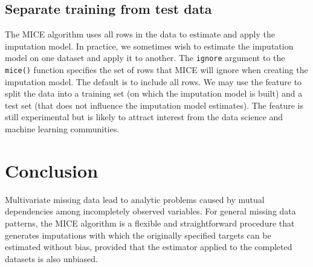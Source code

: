 \documentclass[
]{book}
\begin{document}
\subsection{Separate training from test data}\label{separate-training-from-test-data}

The MICE algorithm uses all rows in the data to estimate and apply the imputation model. In practice, we sometimes wish to estimate the imputation model on one dataset and apply it to another. The \texttt{ignore} argument to the \texttt{mice()} function specifies the set of rows that MICE will ignore when creating the imputation model. The default is to include all rows. We may use the feature to split the data into a training set (on which the imputation model is built) and a test set (that does not influence the imputation model estimates). The feature is still experimental but is likely to attract interest from the data science and machine learning communities.

\section{Conclusion}\label{conclusion}

Multivariate missing data lead to analytic problems caused by mutual dependencies among incompletely observed variables. For general missing data patterns, the MICE algorithm is a flexible and straightforward procedure that generates imputations with which the originally specified targets can be estimated without bias, provided that the estimator applied to the completed datasets is also unbiased.
\end{document}
